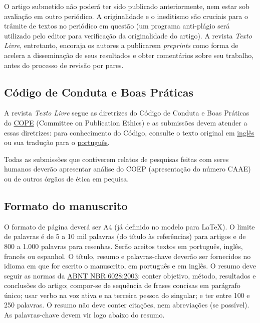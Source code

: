 \documentclass[portuguese]{textolivre}
\begin{document}
O artigo submetido não poderá ter sido publicado anteriormente, nem estar sob avaliação em outro periódico.
A originalidade e o ineditismo são cruciais para o trâmite de textos no periódico
em questão (um programa anti-plágio será utilizado pelo editor para verificação da originalidade do artigo).
A revista \emph{Texto Livre}, entretanto, encoraja os autores a publicarem \emph{preprints}
como forma de acelera a disseminação de seus resultados e obter comentários sobre seu trabalho,
antes do processo de revisão por pares.

\subsection{Código de Conduta e Boas Práticas}\label{sec-conduta}
A revista \emph{Texto Livre} segue as diretrizes do Código de Conduta e Boas Práticas do
\href{http://publicationethics.org/}{COPE} (Committee on Publication Ethics)
e as submissões devem atender a essas diretrizes: para conhecimento do Código,
consulte o texto original em \href{http://publicationethics.org/files/Code_of_conduct_for_journal_editors_1.pdf}{inglês}
ou sua tradução para o \href{http://www.periodicos.letras.ufmg.br/CCBP-COPE.pdf}{português}.

Todas as submissões que contiverem relatos de pesquisas feitas com seres humanos deverão apresentar análise do COEP (apresentação do número CAAE) ou de outros órgãos de ética em pequisa.


\subsection{Formato do manuscrito}\label{sec-fmt-manuscrito}
O formato de página deverá ser A4 (já definido no modelo para \LaTeX{}). O limite de palavras é de 5 a 10 mil palavras (do título às referências)
para artigos e de 800 a 1.000 palavras para resenhas.
Serão aceitos textos em português, inglês, francês ou espanhol.
O título, resumo e palavras-chave deverão ser fornecidos no idioma em que for escrito o manuscrito, em português e em inglês.
O resumo deve seguir as normas da \href{https://www.abntcatalogo.com.br/norma.aspx?ID=2003}{ABNT NBR 6028:2003}: conter objetivo, método, resultados e conclusões do artigo;
compor-se de sequência de frases concisas em parágrafo único;  usar verbo na voz ativa e na terceira pessoa do singular;
e ter entre 100 e 250 palavras. O resumo não deve conter citações, nem abreviações (se possível).
As palavras-chave devem vir logo abaixo do resumo.
\end{document}
